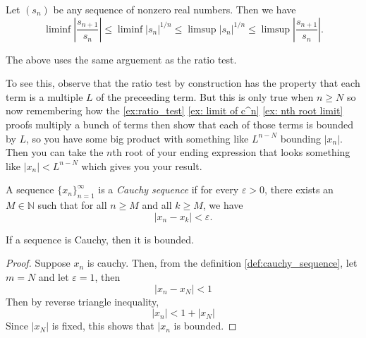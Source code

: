 \documentclass[../main.tex]{subfiles}
\begin{document}
    
    
    
    
    
    
    \begin{exercise}
    Let $(s_n)$ be any sequence of nonzero real numbers. Then we have
    \[
    \liminf \left| \frac{s_{n+1}}{s_n} \right| 
    \leq \liminf |s_n|^{1/n} 
    \leq \limsup |s_n|^{1/n} 
    \leq \limsup \left| \frac{s_{n+1}}{s_n} \right|.
    \]
    
    \end{exercise}
    
    \begin{remark}
    The above uses the same arguement as the ratio test.
\par To see this, observe that the ratio test by construction
has the property that each term is a multiple $L$ of the preceeding term. But this 
is only true when $n \geq N$ so now remembering how the
\ref{ex:ratio_test} \ref{ex: limit of c^n} \ref{ex: nth root limit} proofs multiply
a bunch of terms then show that each of those terms is bounded by $L$, 
so you have some big product with something like $L^{n-N}$ bounding $|x_n|$. Then
you can take the $n$th root of your ending expression that looks something like
 $|x_n| < L^{n-N}$ which gives you your result. 
    \end{remark}
    
    

    
    
    
    
    \begin{definition}\label{def:cauchy_sequence}
    A sequence \( \{x_n\}_{n=1}^{\infty} \) is a \textit{Cauchy sequence} if for every \( \varepsilon > 0 \), there exists an \( M \in \mathbb{N} \) such that for all \( n \geq M \) and all \( k \geq M \), we have
    \[
    |x_n - x_k| < \varepsilon.
    \]
    \end{definition}
    
    
    
    
    
    
    
    
    
    \begin{lemma}\label{lem:if cauchy then bounded}
    If a sequence is Cauchy, then it is bounded. 
    \end{lemma}
    
    \begin{proof}
    Suppose $x_n$ is cauchy. Then, from the definition \ref{def:cauchy_sequence}, let $m = N$ and let $\varepsilon = 1$, then
    \[
    |x_n - x_N| < 1
    \]
    Then by reverse triangle inequality, 
    \[
    |x_n| < 1+|x_N|
    \]
    Since $|x_N|$ is fixed, this shows that $|x_n$ is bounded. 
    \end{proof}
    
\end{document}
